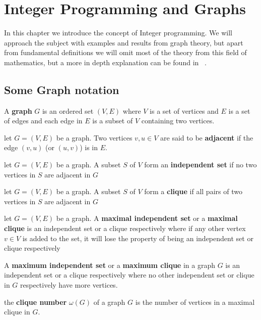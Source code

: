 \chapter{Integer Programming and Graphs}
In this chapter we introduce the concept of Integer programming. We will approach the subject with examples and results from graph theory, but apart from fundamental definitions we will omit most of the theory from this field of mathematics, but a more in depth explanation can be found in ~\cite{wolsey1998integer}. 
\section{Some Graph notation}
\begin{definition}\label{graph}
A \textbf{graph} $G$ is an ordered set $(V,E)$ where $V$ is a set of vertices and $E$ is a set of edges and each edge in $E$ is a subset of $V$ containing two vertices.
\end{definition}
\begin{definition}
let $G=(V,E)$ be a graph. Two vertices $v,u\in V$ are said to be \textbf{adjacent} if the edge $(v,u)$ (or $(u,v)$) is in $E$.
\end{definition}
\begin{definition}
let $G=(V,E)$ be a graph. A subset $S$ of $V$ form an \textbf{independent set} if no two vertices in $S$ are adjacent in $G$
\end{definition}
\begin{definition}
let $G=(V,E)$ be a graph. A subset $S$ of $V$ form a \textbf{clique} if all pairs of two vertices in $S$ are adjacent in $G$
\end{definition}
\begin{definition}
let $G=(V,E)$ be a graph. A \textbf{maximal independent set} or a \textbf{maximal clique} is an independent set or a clique respectively where if any other vertex $v \in V$ is added to the set, it will lose the property of being an independent set or clique respectively 
\end{definition}
\begin{definition}
A \textbf{maximum independent set} or a \textbf{maximum clique} in a graph $G$ is an independent set or a clique respectively where no other independent set or clique in $G$ respectively have more vertices.
\end{definition}
\begin{definition}
the \textbf{clique number} $\omega(G)$ of a graph $G$ is the number of vertices in a maximal clique in $G$.
\end{definition}

